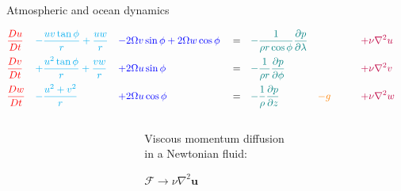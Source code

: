 \documentclass[aspectratio=169,xcolor=dvipsnames]{beamer}
\begin{document}
\begin{frame}[t]{Atmospheric and ocean dynamics}
\vspace{0em}
\hspace{10cm}
{\small \,\,}


\begin{align*}
    &\textcolor{red}{    \frac{Du}{Dt}   }&
    &\textcolor{cyan}{   - \frac{uv \tan\phi}{r} + \frac{uw}{r}  }& 
    & \textcolor{blue}{   - 2\Omega v \sin\phi + 2\Omega w \cos\phi   }&
    & = &
    &\textcolor{teal}{   -\frac{1}{\rho r \cos\phi}\frac{\partial p}{\partial \lambda}  }&
    &&
    & \textcolor{purple}{\quad + \nu \nabla^2 u }&
    \\
    &\textcolor{red}{    \frac{Dv}{Dt}   } &
    &\textcolor{cyan}{   + \frac{u^2 \tan\phi}{r} + \frac{vw}{r}     }&
    & \textcolor{blue}{   + 2\Omega u \sin\phi    }&
    & = &
    &\textcolor{teal}{   -\frac{1}{\rho r}\frac{\partial p}{\partial \phi}  }&
    &&
    & \textcolor{purple}{\quad + \nu \nabla^2 v }&
    \\
    &\textcolor{red}{    \frac{Dw}{Dt}   } &
    &\textcolor{cyan}{   - \frac{u^2 + v^2}{r}   }&
    & \textcolor{blue}{   + 2\Omega u \cos\phi    }&
    & = &
    &\textcolor{teal}{   -\frac{1}{\rho}\frac{\partial p}{\partial z} }&
    & \textcolor{orange}{- g \quad}&
    & \textcolor{purple}{\quad + \nu \nabla^2 w }&
\end{align*}

\begin{columns}
    \begin{column}{0.7\textwidth}
    \end{column}
    \begin{column}{0.3\textwidth}
        \begin{block}{}
            {\footnotesize
            Viscous momentum diffusion \\
            in a Newtonian fluid:
            }
            \begin{center}
            {\small
            $\mathcal{F}\rightarrow\nu\nabla^2\mathbf{u} $
            }
            \end{center}
        \end{block}

    \end{column}
\end{columns}
        
\end{frame}
\end{document}
